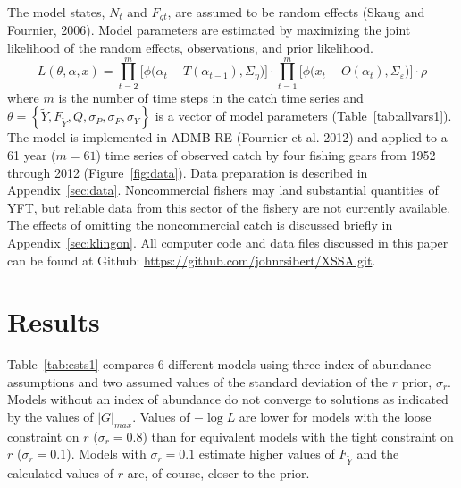\documentclass[12pt,letterpaper]{article}
\newcommand\MSY{\widetilde{Y}}
\newcommand\Fmsy{F_{\MSY}}
\begin{document}
The model states, $N_t$ and $F_{gt}$, are assumed to be random
effects (Skaug and Fournier, 2006). Model parameters are estimated by
maximizing the joint likelihood of the random
effects, observations, and prior likelihood.
\begin{equation}
\label{eqn:likelihood}
L(\theta,\alpha,x)=
\prod^m_{t=2}\big[\phi\big(\alpha_t-T(\alpha_{t-1}), \Sigma_\eta\big)\big]\cdot
\prod^m_{t=1}\big[\phi\big(x_t-O(\alpha_t),
\Sigma_\varepsilon\big)\big]\cdot\rho
\end{equation}
where $m$ is the number of time steps in the catch time series and
$\theta=\left\{\MSY,\Fmsy,Q,\sigma_P,\sigma_F,\sigma_Y\right\}$ 
is a vector of model parameters (Table~\ref{tab:allvars1}).
The model is implemented in ADMB-RE (Fournier et al. 2012) and
applied to a 61 year ($m=61$) time series of observed
catch by four fishing gears from 1952 through 2012
(Figure~\ref{fig:data}).
Data preparation is described in Appendix~\ref{sec:data}.
Noncommercial fishers may land substantial quantities of YFT, but
reliable data from this sector of the fishery are not currently
available. The effects of omitting the noncommercial catch is
discussed briefly in Appendix~\ref{sec:klingon}.
All computer code and data files discussed in this
paper can be found at Github:
\url{https://github.com/johnrsibert/XSSA.git}.

\section*{Results}
Table~\ref{tab:ests1} compares 6 different models
using three index of abundance assumptions and two 
assumed values of the standard deviation of the $r$ prior, $\sigma_r$. 
Models without an index of abundance do not converge to solutions as
indicated by the values of $|G|_{max}$.
Values of $-\log L$ are lower for models with the loose constraint on $r$
($\sigma_r=0.8$) than for equivalent models with the tight constraint on $r$
($\sigma_r=0.1$).
Models with $\sigma_r=0.1$ estimate higher values of $\Fmsy$ and the
calculated values of $r$ are, of course, closer to the prior.
\end{document}
